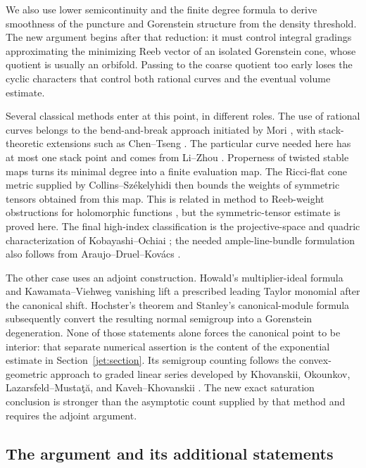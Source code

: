 We also use lower semicontinuity \cite{BL21} and the finite degree
formula \cite{XZ21} to derive smoothness of the puncture and
Gorenstein structure from the density threshold.
The new argument begins after that reduction: it must control
integral gradings approximating the minimizing Reeb vector of an
isolated Gorenstein cone, whose quotient is
usually an orbifold. Passing to the coarse quotient too early loses
the cyclic characters that control both rational curves and the
eventual volume estimate.

Several classical methods enter at this point, in different roles.
The use of rational curves belongs to the bend-and-break approach
initiated by Mori \cite{Mori79}, with stack-theoretic extensions such
as Chen--Tseng \cite{ChenTseng09}. The particular curve needed here
has at most one stack point and comes from Li--Zhou \cite{LZ25}.
Properness of twisted stable maps \cite{AOV11} turns its minimal
degree into a finite evaluation map. The Ricci-flat cone metric
supplied by Collins--Sz\'ekelyhidi \cite{CS19} then bounds the weights
of symmetric tensors obtained from this map. This is related in
method to Reeb-weight obstructions for holomorphic functions
\cite{GMSY07}, but the symmetric-tensor estimate is proved here.
The final high-index classification is the projective-space and
quadric characterization of Kobayashi--Ochiai \cite{KO73}; the
needed ample-line-bundle formulation also follows from
Araujo--Druel--Kov\'acs \cite{ADK08}.

The other case uses an adjoint construction. Howald's multiplier-ideal
formula \cite{Howald01} and Kawamata--Viehweg vanishing
\cite{FujinoKV} lift a prescribed leading Taylor monomial after the
canonical shift. Hochster's theorem and Stanley's canonical-module
formula \cite{Hochster72,Stanley78} subsequently convert the resulting
normal semigroup into a Gorenstein degeneration. None of those
statements alone forces the canonical point to be interior: that
separate numerical assertion is the content of the exponential
estimate in Section~\ref{jet:section}. Its semigroup counting follows
the convex-geometric approach to graded linear series developed by
Khovanskii, Okounkov, Lazarsfeld--Musta\c t\u a, and
Kaveh--Khovanskii
\cite{Khovanskii1992,Okounkov2003,LazarsfeldMustata2009,KavehKhovanskii2012}.
The new exact saturation conclusion is stronger than the asymptotic
count supplied by that method and requires the adjoint argument.

\subsection{The argument and its additional statements}

